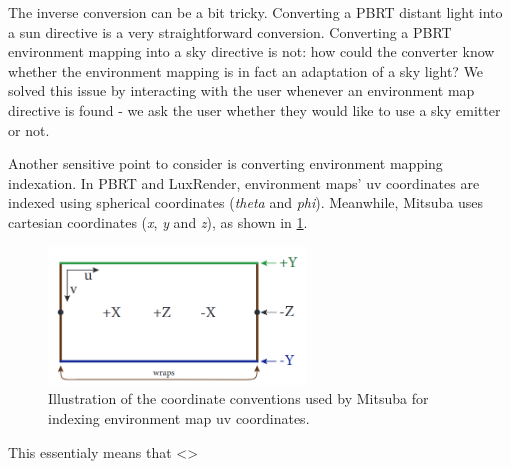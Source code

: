 The inverse conversion can be a bit tricky. Converting a PBRT distant light into
a sun directive is a very straightforward conversion. Converting a PBRT
environment mapping into a sky directive is not: how could the converter know
whether the environment mapping is in fact an adaptation of a sky light? We
solved this issue by interacting with the user whenever an environment map
directive is found - we ask the user whether they would like to use a sky
emitter or not.

Another sensitive point to consider is converting environment mapping indexation. In PBRT and LuxRender, environment maps' uv coordinates are indexed using spherical coordinates (\textit{theta} and \textit{phi}). Meanwhile, Mitsuba uses cartesian coordinates (\textit{x}, \textit{y} and \textit{z}), as shown in \ref{fig:mitdocemitter}. 

\begin{figure}[h]
\centering
\includegraphics[width=2.7in]{figs/3_system_architecture/mitdocemitter.png}
\caption{Illustration of the coordinate conventions used by Mitsuba for indexing environment map uv coordinates.}
\label{fig:mitdocemitter}
\end{figure}

This essentialy means that <>